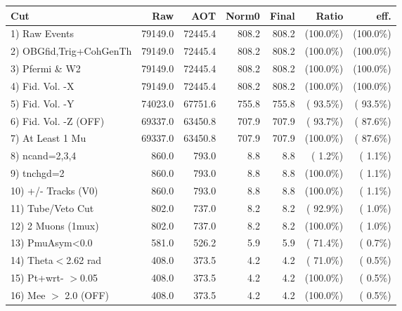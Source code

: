  \begin{table}[h!]\centering
 \begin{tabular}{||l||r|r|r|r|r|r||}
 \hline
 \hline
 Cut & Raw & AOT & Norm0 & Final & Ratio & eff.       \\
 \hline
  1) Raw Events           &      79149.0 &      72445.4 &        808.2 &        808.2 & (100.0\%) & (100.0\%) \\
  2) OBGfid,Trig+CohGenTh &      79149.0 &      72445.4 &        808.2 &        808.2 & (100.0\%) & (100.0\%) \\
  3) Pfermi \& W2         &      79149.0 &      72445.4 &        808.2 &        808.2 & (100.0\%) & (100.0\%) \\
  4) Fid. Vol. -X         &      79149.0 &      72445.4 &        808.2 &        808.2 & (100.0\%) & (100.0\%) \\
  5) Fid. Vol. -Y         &      74023.0 &      67751.6 &        755.8 &        755.8 & ( 93.5\%) & ( 93.5\%) \\
  6) Fid. Vol. -Z (OFF)   &      69337.0 &      63450.8 &        707.9 &        707.9 & ( 93.7\%) & ( 87.6\%) \\
  7) At Least 1 Mu        &      69337.0 &      63450.8 &        707.9 &        707.9 & (100.0\%) & ( 87.6\%) \\
  8) ncand=2,3,4          &        860.0 &        793.0 &          8.8 &          8.8 & (  1.2\%) & (  1.1\%) \\
  9) tnchgd=2             &        860.0 &        793.0 &          8.8 &          8.8 & (100.0\%) & (  1.1\%) \\
 10) +/- Tracks (V0)      &        860.0 &        793.0 &          8.8 &          8.8 & (100.0\%) & (  1.1\%) \\
 11) Tube/Veto Cut        &        802.0 &        737.0 &          8.2 &          8.2 & ( 92.9\%) & (  1.0\%) \\
 12) 2 Muons (1mux)       &        802.0 &        737.0 &          8.2 &          8.2 & (100.0\%) & (  1.0\%) \\
 13) PmuAsym<0.0          &        581.0 &        526.2 &          5.9 &          5.9 & ( 71.4\%) & (  0.7\%) \\
 14) Theta$<$2.62 rad     &        408.0 &        373.5 &          4.2 &          4.2 & ( 71.0\%) & (  0.5\%) \\
 15) Pt+wrt- $>$0.05      &        408.0 &        373.5 &          4.2 &          4.2 & (100.0\%) & (  0.5\%) \\
 16) Mee $>$ 2.0  (OFF)   &        408.0 &        373.5 &          4.2 &          4.2 & (100.0\%) & (  0.5\%) \\

\end{tabular}
\end{table}
